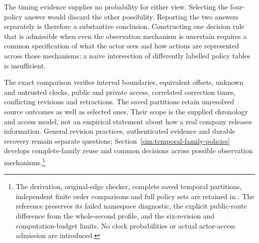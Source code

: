 The timing evidence supplies no probability for either view. Selecting the four-policy answer would discard the other possibility. Reporting the two answers separately is therefore a substantive conclusion. Constructing one decision rule that is admissible when even the observation mechanism is uncertain requires a common specification of what the actor sees and how actions are represented across those mechanisms; a naive intersection of differently labelled policy tables is insufficient.

The exact comparison verifies interval boundaries, equivalent offsets, unknown and untrusted clocks, public and private access, correlated correction times, conflicting revisions and retractions. The saved partitions retain unresolved source outcomes as well as selected ones. Their scope is the supplied chronology and access model, not an empirical statement about how a real company releases information. General revision practices, authenticated evidence and durable recovery remain separate questions; Section~\ref{sim:temporal-family-policies} develops complete-family reuse and common decisions across possible observation mechanisms.\footnote{The derivation, original-edge checker, complete saved temporal partitions, independent finite order comparisons and full policy sets are retained in . The reference preserves its failed namespace diagnostic, the explicit public-route difference from the whole-second profile, and the six-revision and computation-budget limits. No clock probabilities or actual actor-access admission are introduced.}
